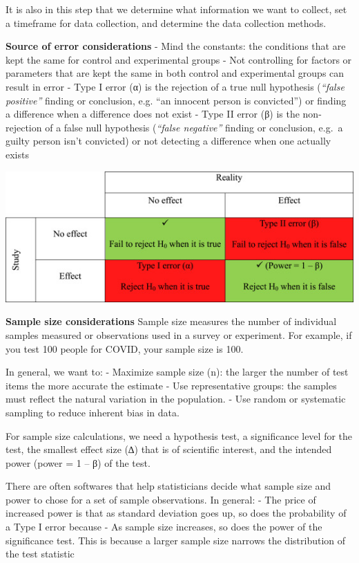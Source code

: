 \documentclass[openany]{book}
\begin{document}
It is also in this step that we determine what information we want to collect, set a timeframe for data collection, and determine the data collection methods.

\textbf{Source of error considerations}
- Mind the constants: the conditions that are kept the same for control and experimental groups
- Not controlling for factors or parameters that are kept the same in both control and experimental groups can result in error
- Type I error (α) is the rejection of a true null hypothesis (\emph{``false positive''} finding or conclusion, e.g. ``an innocent person is convicted'') or finding a difference when a difference does not exist
- Type II error (β) is the non-rejection of a false null hypothesis (\emph{``false negative''} finding or conclusion, e.g.~a guilty person isn't convicted) or not detecting a difference when one actually exists

\includegraphics{fig/null.jpg}

\textbf{Sample size considerations}
Sample size measures the number of individual samples measured or observations used in a survey or experiment. For example, if you test 100 people for COVID, your sample size is 100.

In general, we want to:
- Maximize sample size (n): the larger the number of test items the more accurate the estimate
- Use representative groups: the samples must reflect the natural variation in the population.
- Use random or systematic sampling to reduce inherent bias in data.

For sample size calculations, we need a hypothesis test, a significance level for the test, the smallest effect size (∆) that is of scientific interest, and the intended power (power = 1 -- β) of the test.

There are often softwares that help statisticians decide what sample size and power to chose for a set of sample observations. In general:
- The price of increased power is that as standard deviation goes up, so does the probability of a Type I error because
- As sample size increases, so does the power of the significance test. This is because a larger sample size narrows the distribution of the test statistic
\end{document}
